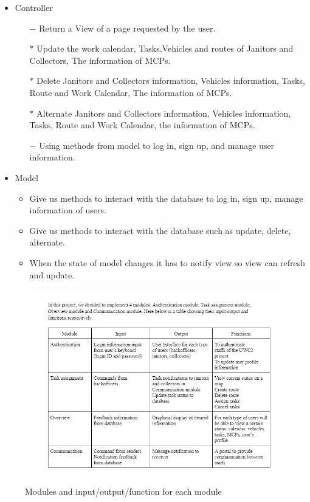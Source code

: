 \documentclass[a4paper]{article}
\begin{document}
\begin{itemize}
\begin{itemize}
    \end{itemize}
    \item Controller
    \begin{itemize}
\item[$-$] Return a View of a page requested by the user.
\item[$*$] Update the work calendar, Tasks,Vehicles and routes of Janitors and Collectors, The information of MCPs.
\item[$*$] Delete Janitors and Collectors information, Vehicles information, Tasks, Route and Work Calendar, The information of MCPs.
\item[$*$] Alternate Janitors and Collectors information, Vehicles information, Tasks, Route and Work Calendar, the information of MCPs.
\item[$-$] Using methods from model to log in, sign up, and manage user information.
    \end{itemize}

    \item Model
    \begin{itemize}
\item Give us methods to interact with the database to log in, sign up, manage information of users.
\item Give us methods to interact with the database such as update, delete, alternate.
\item When the state of model changes it has to notify view so view can refresh and update.

    \end{itemize}
\end{itemize}

\begin{figure}
\centering
  \includegraphics[width=0.6\linewidth]{module.png}
  \hypertarget{module}{\caption{Modules and input/output/function for each module}}
\end{figure}
\end{document}
